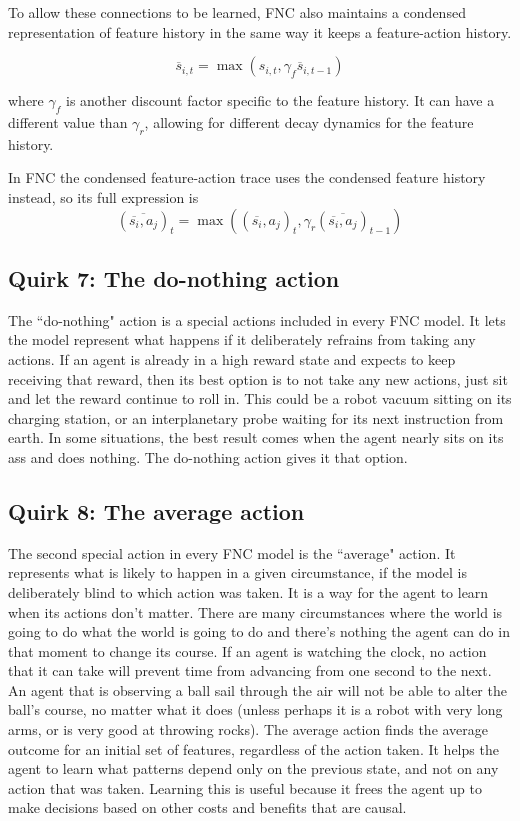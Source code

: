 To allow these connections to be learned, FNC also maintains a
condensed representation of feature history in the same way it
keeps a feature-action history.

\begin{equation}
\overline{s}_{i, t} = \max(s_{i, t}, \gamma_f \overline{s}_{i, t-1})
\end{equation}

where $\gamma_f$ is another discount factor specific to the feature
history. It can have a different value than $\gamma_r$, allowing
for different decay dynamics for the feature history.

In FNC the condensed feature-action trace uses the condensed feature
history instead, so its full expression is
\begin{equation}
(\overline{\overline{s_i}, a_j})_t = \max(
(\overline{s_i}, a_j)_t , 
\gamma_r (\overline{\overline{s_i}, a_j})_{t-1})
\end{equation}

\subsection*{Quirk 7: The do-nothing action}
\label{algodonothing}

The ``do-nothing" action is a special actions included in every FNC model.
It lets the model represent what happens if it deliberately refrains
from taking any actions. If an agent is already in a high reward state and
expects to keep receiving that reward, then its best option is to not
take any new actions, just sit and let the reward
continue to roll in. This could be a robot vacuum sitting on its
charging station, or an interplanetary probe waiting for its next
instruction from earth. In some situations, the best result comes when
the agent nearly sits on its ass and does nothing. The do-nothing action
gives it that option.

\subsection*{Quirk 8: The average action}
\label{algoavgaction}

The second special action in every FNC model is the ``average" action.
It represents what is likely to happen in a given circumstance,
if the model is deliberately blind to which action was taken.
It is a way for the agent to learn when its actions
don’t matter. There are many circumstances where the world is going to do
what the world is going to do and there’s nothing the agent can do
in that moment to change its course. If an agent is watching the clock,
no action that it can take will prevent time from advancing from one
second to the next. An agent that is observing a ball sail through
the air will not be able to alter the ball's course, no matter what it does
(unless perhaps it is a robot with very long arms, or is very good at
throwing rocks). The average action finds the average outcome for
an initial set of features, regardless of the action taken.
It helps the agent to learn what
patterns depend only on the previous state, and not on any action
that was taken. Learning this is useful because it frees the agent up
to make decisions based on other costs and benefits that are causal.

